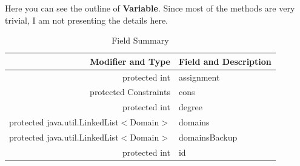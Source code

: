 \documentclass{article}
\begin{document}
Here you can see the outline of \textbf{Variable}. Since most of the methods are very trivial, I am not presenting the details here.



\begin{table}[h]
\begin{center}
  \begin{tabular}{ |r | l | }
    \hline
    Modifier and Type & Field and Description \\ \hline
    protected int &	assignment                          \\ \hline
protected Constraints &	cons                            \\ \hline
protected int &	degree                                  \\ \hline
protected java.util.LinkedList$<$Domain$>$ &	domains       \\ \hline
protected java.util.LinkedList$<$Domain$>$ &	domainsBackup \\ \hline
protected int &	id \\ \hline

  \end{tabular}
\caption{Field Summary}
\end{center}
\end{table}
\end{document}
